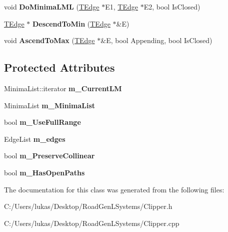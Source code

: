 \begin{DoxyCompactItemize}
void {\bfseries Do\+Minima\+L\+ML} (\hyperlink{struct_clipper_lib_1_1_t_edge}{T\+Edge} $\ast$E1, \hyperlink{struct_clipper_lib_1_1_t_edge}{T\+Edge} $\ast$E2, bool Is\+Closed)
\item 
\hypertarget{class_clipper_lib_1_1_clipper_base_a13086e8d650edc1a024813d3a8469120}{}\label{class_clipper_lib_1_1_clipper_base_a13086e8d650edc1a024813d3a8469120} 
\hyperlink{struct_clipper_lib_1_1_t_edge}{T\+Edge} $\ast$ {\bfseries Descend\+To\+Min} (\hyperlink{struct_clipper_lib_1_1_t_edge}{T\+Edge} $\ast$\&E)
\item 
\hypertarget{class_clipper_lib_1_1_clipper_base_afafbf0dafffb5ad6f5a5c30dbed6378f}{}\label{class_clipper_lib_1_1_clipper_base_afafbf0dafffb5ad6f5a5c30dbed6378f} 
void {\bfseries Ascend\+To\+Max} (\hyperlink{struct_clipper_lib_1_1_t_edge}{T\+Edge} $\ast$\&E, bool Appending, bool Is\+Closed)
\end{DoxyCompactItemize}
\subsection*{Protected Attributes}
\begin{DoxyCompactItemize}
\item 
\hypertarget{class_clipper_lib_1_1_clipper_base_ab6ed40f62810c0f894878c79d74afb36}{}\label{class_clipper_lib_1_1_clipper_base_ab6ed40f62810c0f894878c79d74afb36} 
Minima\+List\+::iterator {\bfseries m\+\_\+\+Current\+LM}
\item 
\hypertarget{class_clipper_lib_1_1_clipper_base_a970749dc12a20e980c932af040f8a8c5}{}\label{class_clipper_lib_1_1_clipper_base_a970749dc12a20e980c932af040f8a8c5} 
Minima\+List {\bfseries m\+\_\+\+Minima\+List}
\item 
\hypertarget{class_clipper_lib_1_1_clipper_base_aea11d183617adc12d7ba2b84533f7f45}{}\label{class_clipper_lib_1_1_clipper_base_aea11d183617adc12d7ba2b84533f7f45} 
bool {\bfseries m\+\_\+\+Use\+Full\+Range}
\item 
\hypertarget{class_clipper_lib_1_1_clipper_base_a8bfc007c0c0afd4e9d252dac0ef5daa0}{}\label{class_clipper_lib_1_1_clipper_base_a8bfc007c0c0afd4e9d252dac0ef5daa0} 
Edge\+List {\bfseries m\+\_\+edges}
\item 
\hypertarget{class_clipper_lib_1_1_clipper_base_aad4ca0f2a16a6fb466036b36cc5ff638}{}\label{class_clipper_lib_1_1_clipper_base_aad4ca0f2a16a6fb466036b36cc5ff638} 
bool {\bfseries m\+\_\+\+Preserve\+Collinear}
\item 
\hypertarget{class_clipper_lib_1_1_clipper_base_aa2508f5b2a599294c359271506441fbd}{}\label{class_clipper_lib_1_1_clipper_base_aa2508f5b2a599294c359271506441fbd} 
bool {\bfseries m\+\_\+\+Has\+Open\+Paths}
\end{DoxyCompactItemize}


The documentation for this class was generated from the following files\+:\begin{DoxyCompactItemize}
\item 
C\+:/\+Users/lukas/\+Desktop/\+Road\+Gen\+L\+Systems/Clipper.\+h\item 
C\+:/\+Users/lukas/\+Desktop/\+Road\+Gen\+L\+Systems/Clipper.\+cpp\end{DoxyCompactItemize}
